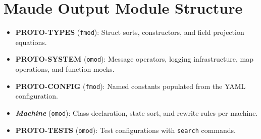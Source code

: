 \documentclass[11pt,letterpaper]{article}
\begin{document}
\section{Maude Output Module Structure}
\label{app:maude-modules}

\begin{center}
\end{center}

\begin{itemize}[leftmargin=1.5em]
  \item \textbf{PROTO-TYPES} (\texttt{fmod}): Struct sorts, constructors,
        and field projection equations.
  \item \textbf{PROTO-SYSTEM} (\texttt{omod}): Message operators, logging
        infrastructure, map operations, and function mocks.
  \item \textbf{PROTO-CONFIG} (\texttt{fmod}): Named constants populated
        from the YAML configuration.
  \item \textbf{\textit{Machine}} (\texttt{omod}): Class declaration,
        state sort, and rewrite rules per machine.
  \item \textbf{PROTO-TESTS} (\texttt{omod}): Test configurations with
        \texttt{search} commands.
\end{itemize}
\end{document}
